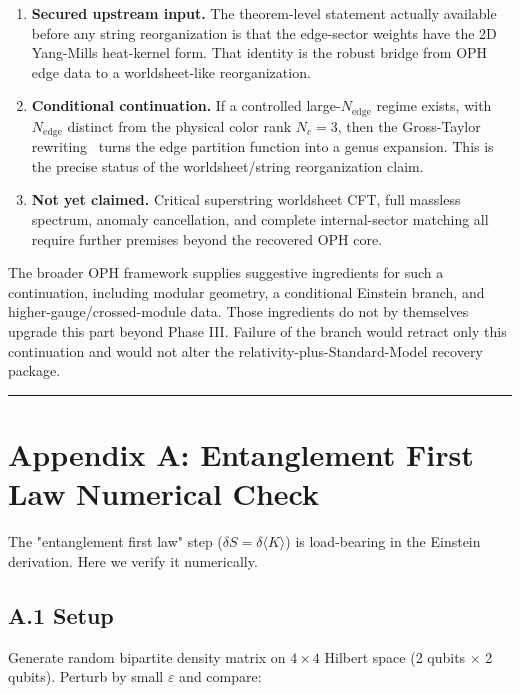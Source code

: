 \begin{enumerate}
\def\labelenumi{\arabic{enumi}.}
\item
  \textbf{Secured upstream input.} The theorem-level statement actually available before any string reorganization is that the edge-sector weights have the 2D Yang-Mills heat-kernel form. That identity is the robust bridge from OPH edge data to a worldsheet-like reorganization.
\item
  \textbf{Conditional continuation.} If a controlled large-\(N_{\mathrm{edge}}\) regime exists, with \(N_{\mathrm{edge}}\) distinct from the physical color rank \(N_c=3\), then the Gross-Taylor rewriting~\cite{grossTaylor93} turns the edge partition function into a genus expansion. This is the precise status of the worldsheet/string reorganization claim.
\item
  \textbf{Not yet claimed.} Critical superstring worldsheet CFT, full massless spectrum, anomaly cancellation, and complete internal-sector matching all require further premises beyond the recovered OPH core.
\end{enumerate}

The broader OPH framework supplies suggestive ingredients for such a continuation, including
modular geometry, a conditional Einstein branch, and higher-gauge/crossed-module data. Those
ingredients do not by themselves upgrade this part beyond Phase III. Failure of the branch would
retract only this continuation and would not alter the relativity-plus-Standard-Model recovery
package.

\begin{center}\rule{0.5\linewidth}{0.5pt}\end{center}

\section{Appendix A: Entanglement First Law Numerical Check}\label{appendix-a-entanglement-first-law-numerical-check}

The "entanglement first law" step (\(\delta S = \delta\langle K \rangle\)) is load-bearing in the Einstein derivation. Here we verify it numerically.

\subsection{A.1 Setup}\label{a1-setup}

Generate random bipartite density matrix on \(4 \times 4\) Hilbert space (2 qubits \ensuremath{\times} 2 qubits). Perturb by small \(\varepsilon\) and compare:

